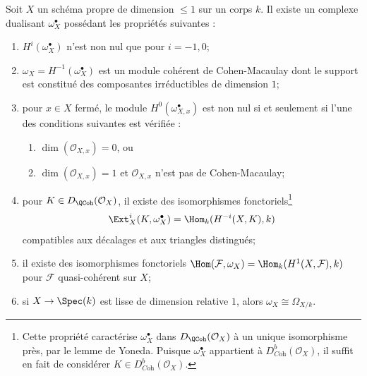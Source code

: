 \begin{lemma}
\label{lemma-duality-dim-1}
Soit $X$ un schéma propre de dimension $\leq 1$ sur un corps $k$. Il existe un complexe dualisant $\omega_X^\bullet$ possédant les propriétés suivantes : \begin{enumerate} \item $H^i(\omega_X^\bullet)$ n'est non nul que pour $i = -1, 0$; \item $\omega_X = H^{-1}(\omega_X^\bullet)$ est un module cohérent de Cohen-Macaulay dont le support est constitué des composantes irréductibles de dimension $1$; \item pour $x \in X$ fermé, le module $H^0(\omega_{X, x}^\bullet)$ est non nul si et seulement si l'une des conditions suivantes est vérifiée : \begin{enumerate} \item $\dim(\mathcal{O}_{X, x}) = 0$, ou \item $\dim(\mathcal{O}_{X, x}) = 1$ et $\mathcal{O}_{X, x}$ n'est pas de Cohen-Macaulay; \end{enumerate} \item pour $K \in D_\QCoh(\mathcal{O}_X)$, il existe des isomorphismes fonctoriels\footnote{Cette propriété caractérise $\omega_X^\bullet$ dans $D_\QCoh(\mathcal{O}_X)$ à un unique isomorphisme près, par le lemme de Yoneda. Puisque $\omega_X^\bullet$ appartient à $D^b_{\textit{Coh}}(\mathcal{O}_X)$, il suffit en fait de considérer $K \in D^b_{\textit{Coh}}(\mathcal{O}_X)$.} $$
\Ext^i_X(K, \omega_X^\bullet) = \Hom_k(H^{-i}(X, K), k)
$$ compatibles aux décalages et aux triangles distingués; \item il existe des isomorphismes fonctoriels $\Hom(\mathcal{F}, \omega_X) = \Hom_k(H^1(X, \mathcal{F}), k)$ pour $\mathcal{F}$ quasi-cohérent sur $X$; \item si $X \to \Spec(k)$ est lisse de dimension relative $1$, alors $\omega_X \cong \Omega_{X/k}$.
\end{enumerate}
\end{lemma}

